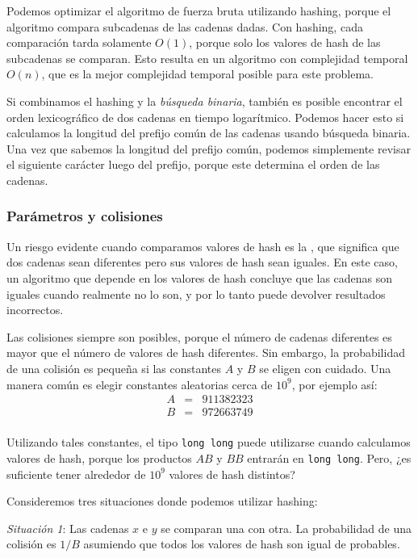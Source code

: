 Podemos optimizar el algoritmo de fuerza bruta utilizando hashing,
porque el algoritmo compara subcadenas de las cadenas dadas.
Con hashing, cada comparación tarda solamente $O(1)$, porque solo
los valores de hash de las subcadenas se comparan. Esto resulta en un
algoritmo con complejidad temporal $O(n)$, que es la mejor complejidad
temporal posible para este problema.

Si combinamos el hashing y la \emph{búsqueda binaria}, también es posible
encontrar el orden lexicográfico de dos cadenas en tiempo logarítmico.
Podemos hacer esto si calculamos la longitud del prefijo común de las
cadenas usando búsqueda binaria. Una vez que sabemos la longitud del
prefijo común, podemos simplemente revisar el siguiente carácter luego
del prefijo, porque este determina el orden de las cadenas.

\subsubsection*{Parámetros y colisiones}


Un riesgo evidente cuando comparamos valores de hash es la ,
que significa que dos cadenas sean diferentes pero sus valores de hash
sean iguales. En este caso, un algoritmo que depende en los valores de hash
concluye que las cadenas son iguales cuando realmente no lo son, y por lo
tanto puede devolver resultados incorrectos.

Las colisiones siempre son posibles, porque el número de cadenas diferentes
es mayor que el número de valores de hash diferentes. Sin embargo, la
probabilidad de una colisión es pequeña si las constantes $A$ y $B$ se
eligen con cuidado. Una manera común es elegir constantes aleatorias cerca
de $10^9$, por ejemplo así:
\[
    \begin{array}{lcl}
        A & = & 911382323 \\
        B & = & 972663749 \\
    \end{array}
\]

Utilizando tales constantes, el tipo \texttt{long long} puede utilizarse
cuando calculamos valores de hash, porque los productos $AB$ y $BB$
entrarán en \texttt{long long}. Pero, ¿es suficiente tener alrededor
de $10^9$ valores de hash distintos?

Consideremos tres situaciones donde podemos utilizar hashing:

\textit{Situación 1}: Las cadenas $x$ e $y$ se comparan una con otra.
La probabilidad de una colisión es $1/B$ asumiendo que todos los valores
de hash son igual de probables.

